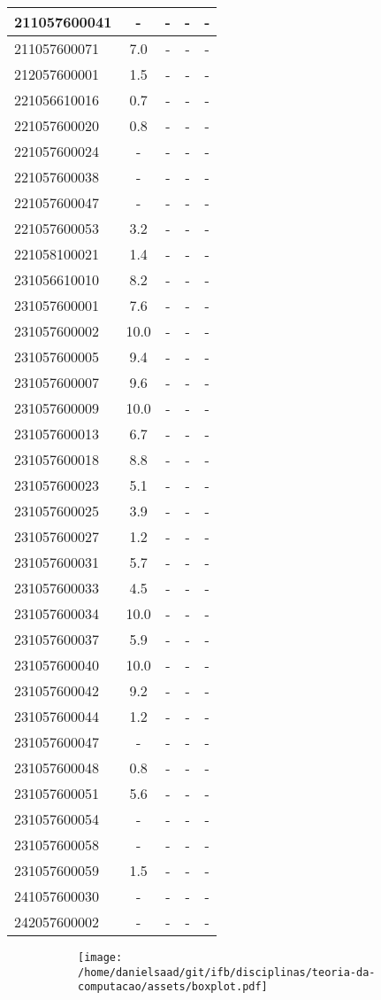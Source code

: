 \documentclass{article}
\begin{document}
\begin{longtable}{|l|c|c|c|c|}
211057600041 & - & - & - & -\\\hline
211057600071 & 7.0 & - & - & -\\\hline
212057600001 & 1.5 & - & - & -\\\hline
221056610016 & 0.7 & - & - & -\\\hline
221057600020 & 0.8 & - & - & -\\\hline
221057600024 & - & - & - & -\\\hline
221057600038 & - & - & - & -\\\hline
221057600047 & - & - & - & -\\\hline
221057600053 & 3.2 & - & - & -\\\hline
221058100021 & 1.4 & - & - & -\\\hline
231056610010 & 8.2 & - & - & -\\\hline
231057600001 & 7.6 & - & - & -\\\hline
231057600002 & 10.0 & - & - & -\\\hline
231057600005 & 9.4 & - & - & -\\\hline
231057600007 & 9.6 & - & - & -\\\hline
231057600009 & 10.0 & - & - & -\\\hline
231057600013 & 6.7 & - & - & -\\\hline
231057600018 & 8.8 & - & - & -\\\hline
231057600023 & 5.1 & - & - & -\\\hline
231057600025 & 3.9 & - & - & -\\\hline
231057600027 & 1.2 & - & - & -\\\hline
231057600031 & 5.7 & - & - & -\\\hline
231057600033 & 4.5 & - & - & -\\\hline
231057600034 & 10.0 & - & - & -\\\hline
231057600037 & 5.9 & - & - & -\\\hline
231057600040 & 10.0 & - & - & -\\\hline
231057600042 & 9.2 & - & - & -\\\hline
231057600044 & 1.2 & - & - & -\\\hline
231057600047 & - & - & - & -\\\hline
231057600048 & 0.8 & - & - & -\\\hline
231057600051 & 5.6 & - & - & -\\\hline
231057600054 & - & - & - & -\\\hline
231057600058 & - & - & - & -\\\hline
231057600059 & 1.5 & - & - & -\\\hline
241057600030 & - & - & - & -\\\hline
242057600002 & - & - & - & -\\\hline
\end{longtable}
\begin{figure}[h!]
\centering\begin{subfigure}
        \centering
        \texttt{[image: /home/danielsaad/git/ifb/disciplinas/teoria-da-computacao/assets/boxplot.pdf]}
    \end{subfigure}\end{figure}
\end{document}
